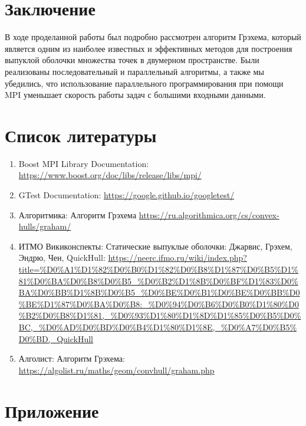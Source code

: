 \documentclass[12pt]{article}
\begin{document}
\section*{Заключение}

В ходе проделанной работы был подробно рассмотрен алгоритм Грэхема, который является одним из наиболее известных и эффективных методов для построения выпуклой оболочки множества точек в двумерном пространстве. Были реализованы последовательный и параллельный алгоритмы, а также мы убедились, что использование параллельного программирования при помощи MPI уменьшает скорость работы задач с большими входными данными.

\newpage

\section*{Список литературы}

\begin{enumerate}
    \item Boost MPI Library Documentation: 
    \url{https://www.boost.org/doc/libs/release/libs/mpi/}
    \item GTest Documentation: 
    \url{https://google.github.io/googletest/}
    \item Алгоритмика: Алгоритм Грэхема 
    \url{https://ru.algorithmica.org/cs/convex-hulls/graham/}
    \item ИТМО Викиконспекты: Статические выпуклые оболочки: Джарвис, Грэхем, Эндрю, Чен, QuickHull: \url{https://neerc.ifmo.ru/wiki/index.php?title=%D0%A1%D1%82%D0%B0%D1%82%D0%B8%D1%87%D0%B5%D1%81%D0%BA%D0%B8%D0%B5_%D0%B2%D1%8B%D0%BF%D1%83%D0%BA%D0%BB%D1%8B%D0%B5_%D0%BE%D0%B1%D0%BE%D0%BB%D0%BE%D1%87%D0%BA%D0%B8:_%D0%94%D0%B6%D0%B0%D1%80%D0%B2%D0%B8%D1%81,_%D0%93%D1%80%D1%8D%D1%85%D0%B5%D0%BC,_%D0%AD%D0%BD%D0%B4%D1%80%D1%8E,_%D0%A7%D0%B5%D0%BD,_QuickHull}
    \item Алголист: Алгоритм Грэхема: 
    \url{https://algolist.ru/maths/geom/convhull/graham.php}
\end{enumerate}

\newpage

\section*{Приложение}
\end{document}
